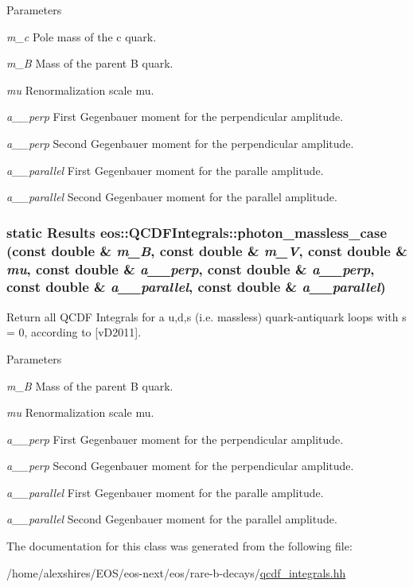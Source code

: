 \begin{DoxyParams}{Parameters}
\item[{\em m\_\-c}]Pole mass of the c quark. \item[{\em m\_\-B}]Mass of the parent B quark. \item[{\em mu}]Renormalization scale mu. \item[{\em a\_\-1\_\-perp}]First Gegenbauer moment for the perpendicular amplitude. \item[{\em a\_\-2\_\-perp}]Second Gegenbauer moment for the perpendicular amplitude. \item[{\em a\_\-1\_\-parallel}]First Gegenbauer moment for the paralle amplitude. \item[{\em a\_\-2\_\-parallel}]Second Gegenbauer moment for the parallel amplitude. \end{DoxyParams}
\hypertarget{classeos_1_1QCDFIntegrals_a20d1967a85e3601633adf14ee4736508}{
\subsubsection[{photon\_\-massless\_\-case}]{\setlength{\rightskip}{0pt plus 5cm}static {\bf Results} eos::QCDFIntegrals::photon\_\-massless\_\-case (const double \& {\em m\_\-B}, \/  const double \& {\em m\_\-V}, \/  const double \& {\em mu}, \/  const double \& {\em a\_\_\-perp}, \/  const double \& {\em a\_\_\-perp}, \/  const double \& {\em a\_\_\-parallel}, \/  const double \& {\em a\_\_\-parallel})}}
\label{classeos_1_1QCDFIntegrals_a20d1967a85e3601633adf14ee4736508}
Return all QCDF Integrals for a u,d,s (i.e. massless) quark-\/antiquark loops with s = 0, according to \mbox{[}vD2011\mbox{]}.


\begin{DoxyParams}{Parameters}
\item[{\em m\_\-B}]Mass of the parent B quark. \item[{\em mu}]Renormalization scale mu. \item[{\em a\_\-1\_\-perp}]First Gegenbauer moment for the perpendicular amplitude. \item[{\em a\_\-2\_\-perp}]Second Gegenbauer moment for the perpendicular amplitude. \item[{\em a\_\-1\_\-parallel}]First Gegenbauer moment for the paralle amplitude. \item[{\em a\_\-2\_\-parallel}]Second Gegenbauer moment for the parallel amplitude. \end{DoxyParams}


The documentation for this class was generated from the following file:\begin{DoxyCompactItemize}
\item 
/home/alexshires/EOS/eos-\/next/eos/rare-\/b-\/decays/\hyperlink{qcdf__integrals_8hh}{qcdf\_\-integrals.hh}\end{DoxyCompactItemize}

